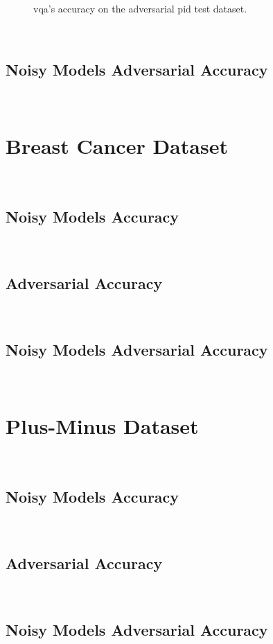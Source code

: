 \begin{figure}[!h]
  \caption{\ac{vqa}'s accuracy on the adversarial \ac{pid} test dataset.}
  \label{fig:diabetes-34}
\end{figure} \

\subsection{Noisy Models Adversarial Accuracy}\label{subsection:diabetes-noisy-adv-acc} \

\section{Breast Cancer Dataset}\label{section:breast-cancer-eval} \

\subsection{Noisy Models Accuracy}\label{subsection:breast-cancer-noisy-acc} \

\subsection{Adversarial Accuracy}\label{subsection:breast-cancer-adv-acc} \

\subsection{Noisy Models Adversarial Accuracy}\label{subsection:breast-cancer-noisy-adv-acc} \

\section{Plus-Minus Dataset}\label{section:plus-minus-eval} \

\subsection{Noisy Models Accuracy}\label{subsection:plus-minus-noisy-acc} \

\subsection{Adversarial Accuracy}\label{subsection:plus-minus-adv-acc} \

\subsection{Noisy Models Adversarial Accuracy}\label{subsection:plus-minus-noisy-adv-acc} \

